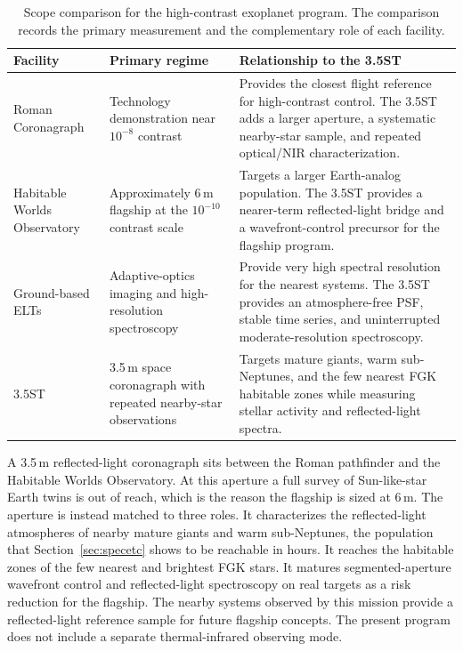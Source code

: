 \begin{table}[tp]
\centering
\caption{Scope comparison for the high-contrast exoplanet program. The
comparison records the primary measurement and the complementary role of
each facility.}
\label{tab:exoplanet_comparison}
\begin{tabularx}{\textwidth}{@{}p{34mm}p{31mm}X@{}}
\hline
\textbf{Facility} & \textbf{Primary regime} & \textbf{Relationship to the 3.5ST}\\
\hline
Roman Coronagraph & Technology demonstration near $10^{-8}$ contrast &
Provides the closest flight reference for high-contrast control. The 3.5ST
adds a larger aperture, a systematic nearby-star sample, and repeated
optical/NIR characterization.\\
Habitable Worlds Observatory & Approximately 6\,m flagship at the
$10^{-10}$ contrast scale & Targets a larger Earth-analog population. The
3.5ST provides a nearer-term reflected-light bridge and a wavefront-control
precursor for the flagship program.\\
Ground-based ELTs & Adaptive-optics imaging and high-resolution spectroscopy &
Provide very high spectral resolution for the nearest systems. The 3.5ST
provides an atmosphere-free PSF, stable time series, and uninterrupted
moderate-resolution spectroscopy.\\
3.5ST & 3.5\,m space coronagraph with repeated nearby-star observations &
Targets mature giants, warm sub-Neptunes, and the few nearest FGK habitable
zones while measuring stellar activity and reflected-light spectra.\\
\hline
\end{tabularx}
\end{table}

A 3.5\,m reflected-light coronagraph sits between the Roman pathfinder and
the Habitable Worlds Observatory. At this aperture a full survey of
Sun-like-star Earth twins is out of reach, which is the reason the
flagship is sized at 6\,m. The aperture is instead matched to three
roles. It characterizes the reflected-light atmospheres of nearby mature
giants and warm sub-Neptunes, the population that Section~\ref{sec:specetc}
shows to be reachable in hours. It reaches the habitable zones of the few
nearest and brightest FGK stars. It matures segmented-aperture wavefront
control and reflected-light spectroscopy on real targets as a risk
reduction for the flagship. The nearby systems observed by this mission
provide a reflected-light reference sample for future flagship concepts.
The present program does not include a separate thermal-infrared observing
mode.
